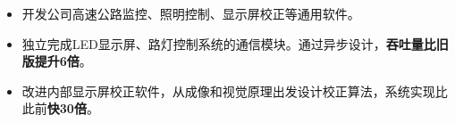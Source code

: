 \documentclass[10pt,a4paper]{moderncv/moderncv}
\begin{document}
{
\begin{itemize}
	\item 开发公司高速公路监控、照明控制、显示屏校正等通用软件。
	\item 独立完成LED显示屏、路灯控制系统的通信模块。通过异步设计，\textbf{吞吐量比旧版提升6倍}。
	\item 改进内部显示屏校正软件，从成像和视觉原理出发设计校正算法，系统实现比此前\textbf{快30倍}。
\end{itemize}
}

{
}

\end{document}
